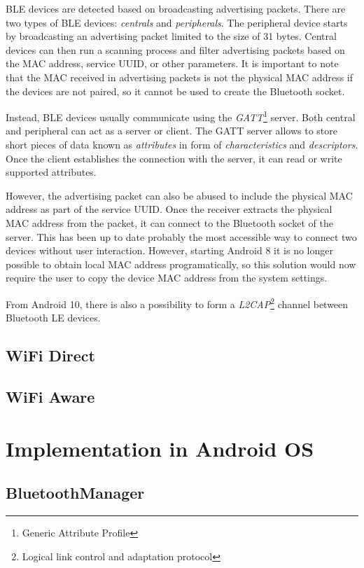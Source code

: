 \documentclass[conference,compsoc]{IEEEtran}
\begin{document}
BLE devices are detected based on broadcasting advertising packets. There are two types of BLE devices: \textit{centrals} and \textit{peripherals}. The peripheral device starts by broadcasting an advertising packet limited to the size of 31 bytes. Central devices can then run a scanning process and filter advertising packets based on the MAC address, service UUID, or other parameters. It is important to note that the MAC received in advertising packets is not the physical MAC address if the devices are not paired, so it cannot be used to create the Bluetooth socket. \cite{ble:privacy} 

Instead, BLE devices usually communicate using the \textit{GATT}\footnote{Generic Attribute Profile} server. Both central and peripheral can act as a server or client. The GATT server allows to store short pieces of data known as \textit{attributes} in form of \textit{characteristics} and \textit{descriptors}. Once the client establishes the connection with the server, it can read or write supported attributes.

However, the advertising packet can also be abused to include the physical MAC address as part of the service UUID. Once the receiver extracts the physical MAC address from the packet, it can connect to the Bluetooth socket of the server. This has been up to date probably the most accessible way to connect two devices without user interaction. However, starting Android 8 it is no longer possible to obtain local MAC address programatically, so this solution would now require the user to copy the device MAC address from the system settings.

From Android 10, there is also a possibility to form a \textit{L2CAP}\footnote{Logical link control and adaptation protocol} channel between Bluetooth LE devices.

\subsection{WiFi Direct}
\subsection{WiFi Aware}

\section{Implementation in Android OS} \label{android}
\subsection{BluetoothManager}
\end{document}
